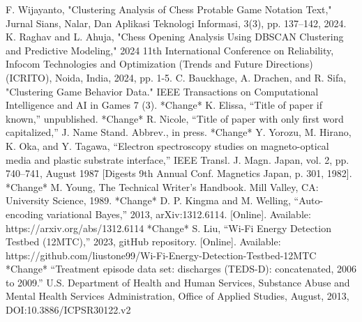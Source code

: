 \documentclass[conference]{IEEEtran}
\begin{document}
\begin{thebibliography}{00}
 F. Wijayanto, "Clustering Analysis of Chess Protable Game Notation Text," Jurnal Sians, Nalar, Dan Aplikasi Teknologi Informasi, 3(3), pp. 137--142, 2024.
 K. Raghav and L. Ahuja, "Chess Opening Analysis Using DBSCAN Clustering and Predictive Modeling," 2024 11th International Conference on Reliability, Infocom Technologies and Optimization (Trends and Future Directions) (ICRITO), Noida, India, 2024, pp. 1-5.
 C. Bauckhage, A. Drachen, and R. Sifa, "Clustering Game Behavior Data." IEEE Transactions on Computational Intelligence and AI in Games 7 (3).
 *Change* K. Elissa, ``Title of paper if known,'' unpublished.
 *Change* R. Nicole, ``Title of paper with only first word capitalized,'' J. Name Stand. Abbrev., in press.
 *Change* Y. Yorozu, M. Hirano, K. Oka, and Y. Tagawa, ``Electron spectroscopy studies on magneto-optical media and plastic substrate interface,'' IEEE Transl. J. Magn. Japan, vol. 2, pp. 740--741, August 1987 [Digests 9th Annual Conf. Magnetics Japan, p. 301, 1982].
 *Change* M. Young, The Technical Writer's Handbook. Mill Valley, CA: University Science, 1989.
 *Change* D. P. Kingma and M. Welling, ``Auto-encoding variational Bayes,'' 2013, arXiv:1312.6114. [Online]. Available: https://arxiv.org/abs/1312.6114
 *Change* S. Liu, ``Wi-Fi Energy Detection Testbed (12MTC),'' 2023, gitHub repository. [Online]. Available: https://github.com/liustone99/Wi-Fi-Energy-Detection-Testbed-12MTC
 *Change* ``Treatment episode data set: discharges (TEDS-D): concatenated, 2006 to 2009.'' U.S. Department of Health and Human Services, Substance Abuse and Mental Health Services Administration, Office of Applied Studies, August, 2013, DOI:10.3886/ICPSR30122.v2
\end{thebibliography}
\end{document}
